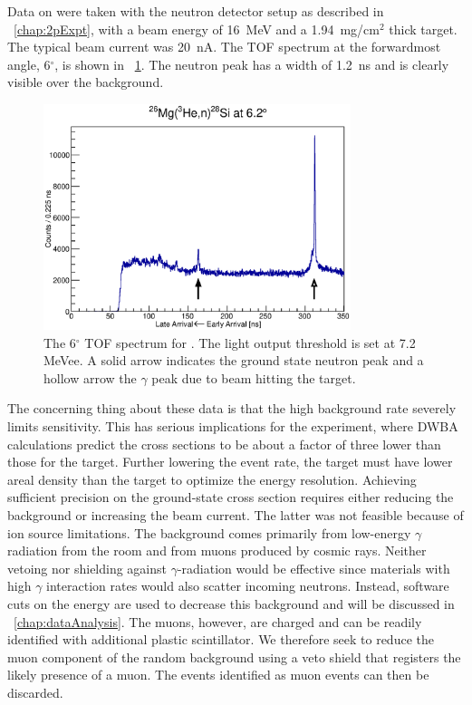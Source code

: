 Data on \MgReaction were taken with the neutron detector setup as described in {\chap}~\ref{chap:2pExpt}, with a beam energy of 16~MeV and a 1.94~mg/cm$^2$ thick  target.  The typical beam current was 20~nA. The TOF spectrum at the forwardmost angle, 6$^{\circ}$, is shown in {\fig}~\ref{fig:MgTOF}.  The neutron peak has a width of 1.2~ns and is clearly visible over the background. 
\begin{figure}[!htbp]
\centering
\includegraphics[width=0.8\textwidth]{figures/26Mg_veryOld.eps}
\caption{The 6$^{\circ}$ TOF spectrum for \MgReaction.  The light output threshold is set at 7.2 MeVee.  A solid arrow indicates the ground state neutron peak and a hollow arrow the $\gamma$ peak due to beam hitting the target.}
\label{fig:MgTOF}
\end{figure}

The concerning thing about these data is that the high background rate severely limits sensitivity.  This has serious implications for the \GeTargets experiment, where DWBA calculations predict the cross sections to be about a factor of three lower than those for the  target.  Further lowering the event rate, the \GeTargets target must have lower areal density than the  target to optimize the energy resolution.  Achieving sufficient precision on the ground-state cross section requires either reducing the background or increasing the beam current.  The latter was not feasible because of ion source limitations.  The background comes primarily from low-energy $\gamma$ radiation from the room and from muons produced by cosmic rays.  Neither vetoing nor shielding against $\gamma$-radiation would be effective since materials with high $\gamma$ interaction rates would also scatter incoming neutrons.  Instead, software cuts on the energy are used to decrease this background and will be discussed in {\chap}~\ref{chap:dataAnalysis}.  The muons, however, are charged and can be readily identified with additional plastic scintillator.  We therefore seek to reduce the muon component of the random background using a veto shield that registers the likely presence of a muon.  The events identified as muon events can then be discarded.  

